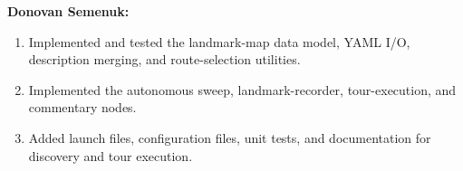 \documentclass[12pt]{article}
\begin{document}
\textbf{Donovan Semenuk:}
\begin{enumerate}
    \item Implemented and tested the landmark-map data model, YAML I/O, description merging, and route-selection utilities.
    \item Implemented the autonomous sweep, landmark-recorder, tour-execution, and commentary nodes.
    \item Added launch files, configuration files, unit tests, and documentation for discovery and tour execution.
\end{enumerate}
\end{document}
